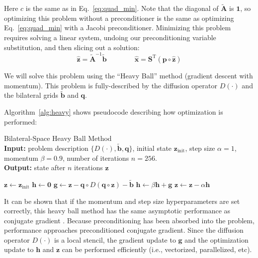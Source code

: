 Here $c$ is the same as in Eq.~\ref{eq:quad_min}. Note that the diagonal of $\tilde{\mathbf{A}}$ is $\mathbf{1}$, so optimizing this problem without a preconditioner is the same as optimizing Eq.~\ref{eq:quad_min} with a Jacobi preconditioner. Minimizing this problem requires solving a linear system, undoing our preconditioning variable substitution, and then slicing out a solution:
\begin{equation*}
\hat{\mathbf{z}} = \tilde{\mathbf{A}}^{-1} \tilde{\mathbf{b}}  \quad  \quad \quad \quad
\mathbf{\hat x} = \mathbf{S}^\mathrm{T}\left( \mathbf{p} \circ \hat{\mathbf{z}}  \right)
\end{equation*}

We will solve this problem using the ``Heavy Ball'' method (gradient descent with momentum).
This problem is fully-described by the diffusion operator $D(\cdot)$ and the bilateral grids $\tilde{\mathbf{b}}$ and $\mathbf{q}$.

Algorithm~\ref{alg:heavy} shows pseudocode describing how optimization is performed:

\begin{algorithm}[h]
\caption{Bilateral-Space Heavy Ball Method \label{alg:heavy} \\
\textbf{Input:}
problem description $\{ D(\cdot), \tilde{\mathbf{b}}, \mathbf{q} \}$,
initial state $\mathbf{z}_{\mathrm{init}}$,
step size $\alpha = 1$,
momentum $\beta = 0.9$,
number of iterations $n = 256$.
\\
\textbf{Output:} state after $n$ iterations $\mathbf{z}$ }
\begin{algorithmic}[1]
\State $\mathbf{z} \gets \mathbf{z}_{\mathrm{init}}$
\State $\mathbf{h} \gets \mathbf{0}$
\State $ \mathbf{g} \gets \mathbf{z} -\mathbf{q} \circ D( \mathbf{q} \circ \mathbf{z} ) - \tilde{\mathbf{b}}$
\State $ \mathbf{h} \gets \beta \mathbf{h} + \mathbf{g}$
\State $ \mathbf{z} \gets \mathbf{z} - \alpha \mathbf{h}$
\EndFor
\end{algorithmic}
\end{algorithm}

It can be shown that if the momentum and step size hyperparameters are set correctly, this heavy ball method has the same asymptotic performance as conjugate gradient \cite{polyak1964some}.
Because preconditioning has been absorbed into the problem, performance approaches preconditioned conjugate gradient.
Since the diffusion operator $D(\cdot)$ is a local stencil, the gradient update to $\mathbf{g}$ and the optimization update to $\mathbf{h}$ and $\mathbf{z}$ can be performed efficiently (i.e., vectorized, parallelized, etc).

